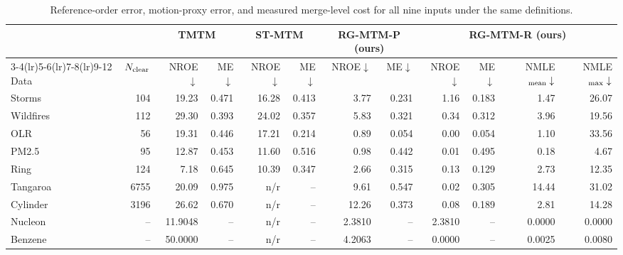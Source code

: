 \begin{table}[t]
\caption{Reference-order error, motion-proxy error, and measured merge-level cost for all nine inputs under the same definitions.}\label{tab:tradeoff}
\centering\footnotesize\setlength{\tabcolsep}{4pt}
\begin{tabular}{lrrrrrrrrrrr}\toprule
 & & \multicolumn{2}{c}{TMTM} & \multicolumn{2}{c}{ST-MTM} & \multicolumn{2}{c}{RG-MTM-P (ours)} & \multicolumn{4}{c}{RG-MTM-R (ours)}\\
\cmidrule(lr){3-4}\cmidrule(lr){5-6}\cmidrule(lr){7-8}\cmidrule(lr){9-12}
Data & $N_{\rm clear}$ & NROE$\downarrow$ & ME$\downarrow$ & NROE$\downarrow$ & ME$\downarrow$ & NROE$\downarrow$ & ME$\downarrow$ & NROE$\downarrow$ & ME$\downarrow$ & NMLE$_{\rm mean}\downarrow$ & NMLE$_{\rm max}\downarrow$\\\midrule
Storms & 104 & 19.23 & 0.471 & 16.28 & 0.413 & 3.77 & 0.231 & 1.16 & 0.183 & 1.47 & 26.07\\
Wildfires & 112 & 29.30 & 0.393 & 24.02 & 0.357 & 5.83 & 0.321 & 0.34 & 0.312 & 3.96 & 19.56\\
OLR & 56 & 19.31 & 0.446 & 17.21 & 0.214 & 0.89 & 0.054 & 0.00 & 0.054 & 1.10 & 33.56\\
PM2.5 & 95 & 12.87 & 0.453 & 11.60 & 0.516 & 0.98 & 0.442 & 0.01 & 0.495 & 0.18 & 4.67\\
Ring & 124 & 7.18 & 0.645 & 10.39 & 0.347 & 2.66 & 0.315 & 0.13 & 0.129 & 2.73 & 12.35\\
Tangaroa & 6755 & 20.09 & 0.975 & n/r & -- & 9.61 & 0.547 & 0.02 & 0.305 & 14.44 & 31.02\\
Cylinder & 3196 & 26.62 & 0.670 & n/r & -- & 12.26 & 0.373 & 0.08 & 0.189 & 2.81 & 14.28\\
Nucleon & -- & 11.9048 & -- & n/r & -- & 2.3810 & -- & 2.3810 & -- & 0.0000 & 0.0000\\
Benzene & -- & 50.0000 & -- & n/r & -- & 4.2063 & -- & 0.0000 & -- & 0.0025 & 0.0080\\
\bottomrule\end{tabular}
\par{}
\end{table}
